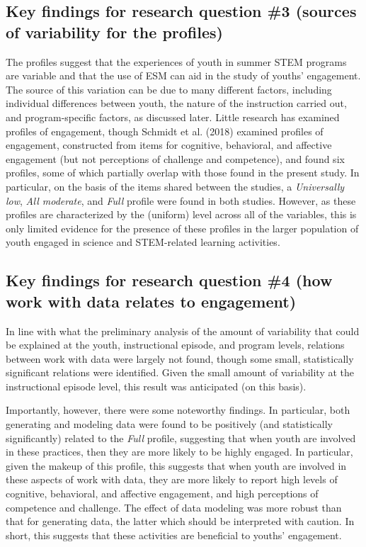 \documentclass[]{book}
\theoremstyle{definition}
\theoremstyle{definition}
\theoremstyle{definition}
\theoremstyle{remark}
\begin{document}
\subsection{Key findings for research question \#3 (sources of
variability for the
profiles)}\label{key-findings-for-research-question-3-sources-of-variability-for-the-profiles}

The profiles suggest that the experiences of youth in summer STEM
programs are variable and that the use of ESM can aid in the study of
youths' engagement. The source of this variation can be due to many
different factors, including individual differences between youth, the
nature of the instruction carried out, and program-specific factors, as
discussed later. Little research has examined profiles of engagement,
though Schmidt et al. (2018) examined profiles of engagement,
constructed from items for cognitive, behavioral, and affective
engagement (but not perceptions of challenge and competence), and found
six profiles, some of which partially overlap with those found in the
present study. In particular, on the basis of the items shared between
the studies, a \emph{Universally low}, \emph{All moderate}, and
\emph{Full} profile were found in both studies. However, as these
profiles are characterized by the (uniform) level across all of the
variables, this is only limited evidence for the presence of these
profiles in the larger population of youth engaged in science and
STEM-related learning activities.

\subsection{Key findings for research question \#4 (how work with data
relates to
engagement)}\label{key-findings-for-research-question-4-how-work-with-data-relates-to-engagement}

In line with what the preliminary analysis of the amount of variability
that could be explained at the youth, instructional episode, and program
levels, relations between work with data were largely not found, though
some small, statistically significant relations were identified. Given
the small amount of variability at the instructional episode level, this
result was anticipated (on this basis).

Importantly, however, there were some noteworthy findings. In
particular, both generating and modeling data were found to be
positively (and statistically significantly) related to the \emph{Full}
profile, suggesting that when youth are involved in these practices,
then they are more likely to be highly engaged. In particular, given the
makeup of this profile, this suggests that when youth are involved in
these aspects of work with data, they are more likely to report high
levels of cognitive, behavioral, and affective engagement, and high
perceptions of competence and challenge. The effect of data modeling was
more robust than that for generating data, the latter which should be
interpreted with caution. In short, this suggests that these activities
are beneficial to youths' engagement.
\end{document}
